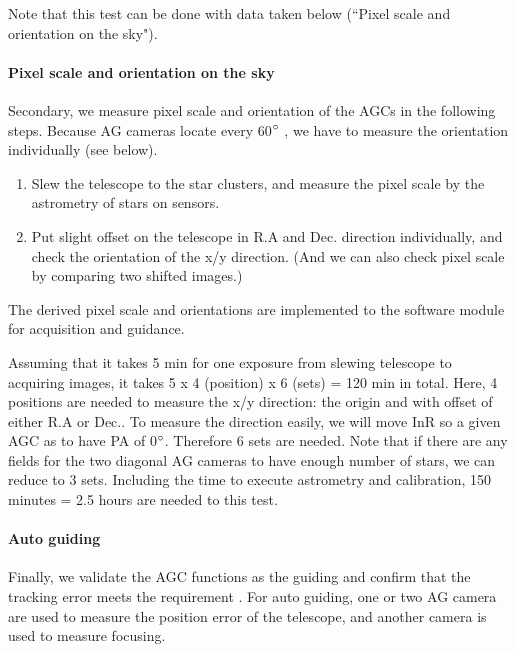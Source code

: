 Note that this test can be done with data taken below (``Pixel scale and orientation on the sky").

\paragraph{Pixel scale and orientation on the sky}
Secondary, we measure pixel scale and orientation of the AGCs in the following steps.
Because AG cameras locate every 60$^\circ$ , we have to measure the orientation individually (see below).

\begin{enumerate}
\item Slew the telescope to the star clusters, and measure the pixel scale by the astrometry of stars on sensors.
\item Put slight offset on the telescope in R.A and Dec. direction individually, and check the orientation of the x/y direction.
(And we can also check pixel scale by comparing two shifted images.)
\end{enumerate}
The derived pixel scale and orientations are implemented to the software module for acquisition and guidance.

Assuming that it takes 5 min for one exposure from slewing telescope to acquiring images, 
it takes 5 x 4 (position) x 6 (sets) = 120 min in total.
Here, 4 positions are needed  to measure the x/y  direction: the origin and with offset of either R.A or Dec..
To measure the direction easily, we will move InR so a given AGC as to have PA of 0$^\circ$.
Therefore 6 sets are needed.
Note that if there are any fields for the two diagonal AG cameras to have enough number of stars, we can reduce to 3 sets.
Including the time to execute astrometry and calibration, 150 minutes = 2.5 hours are needed to this test.


\paragraph{Auto guiding}
Finally, we validate the AGC functions as the guiding and confirm that the tracking error meets the requirement .
For auto guiding, one or two AG camera are used to measure the position error of the telescope, and another camera is used to measure focusing.

